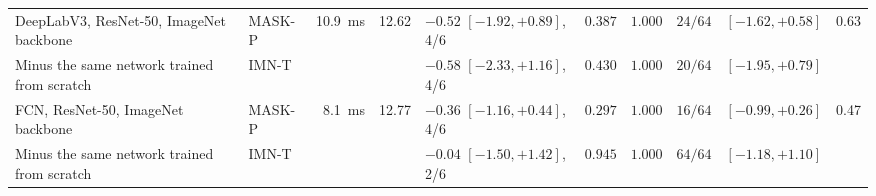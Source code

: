 \begin{table}[tp]
\begin{tabularx}{\textwidth}{@{}>{\raggedright\arraybackslash}X l r r l r r r l r@{}}
\quad DeepLabV3, ResNet-50, ImageNet backbone~\cite{chen2017deeplabv3,he2016resnet} & MASK-P & 10.9~ms & 12.62 & $-0.52$ $[-1.92, +0.89]$, 4/6 & $0.387$ & $1.000$ & $24/64$ & $[-1.62, +0.58]$ & 0.63 \\
\quad\quad Minus the same network trained from scratch & IMN-T & & & $-0.58$ $[-2.33, +1.16]$, 4/6 & $0.430$ & $1.000$ & $20/64$ & $[-1.95, +0.79]$ & \\
\quad FCN, ResNet-50, ImageNet backbone~\cite{long2015fcn,he2016resnet} & MASK-P & 8.1~ms & 12.77 & $-0.36$ $[-1.16, +0.44]$, 4/6 & $0.297$ & $1.000$ & $16/64$ & $[-0.99, +0.26]$ & 0.47 \\
\quad\quad Minus the same network trained from scratch & IMN-T & & & $-0.04$ $[-1.50, +1.42]$, 2/6 & $0.945$ & $1.000$ & $64/64$ & $[-1.18, +1.10]$ & \\
\bottomrule
\end{tabularx}
\end{table}

